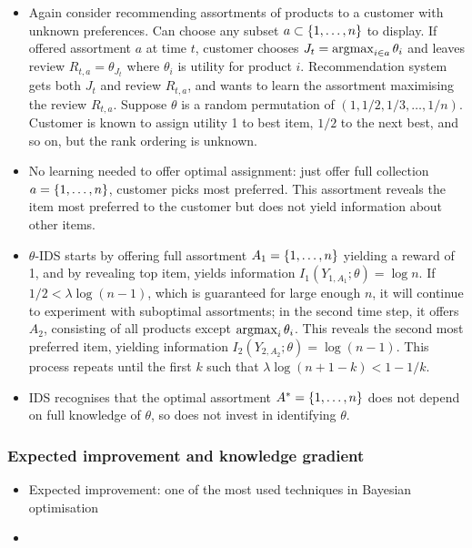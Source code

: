 \documentclass[11pt, openany]{book}
\begin{document}
\begin{example}
    \vspace*{-20pt}
    \begin{itemize}
        \item Again consider recommending assortments of products to a customer with unknown preferences. Can choose any subset $a\subset\left\lbrace1,\dots,n\right\rbrace$ to display. If offered assortment $a$ at time $t$, customer chooses $J_t=\operatorname*{argmax}_{i\in a} \theta_i$ and leaves review $R_{t,a}=\theta_{J_t}$ where $\theta_i$ is utility for product $i$. Recommendation system gets both $J_t$ and review $R_{t,a}$, and wants to learn the assortment maximising the review $R_{t,a}$. Suppose $\theta$ is a random permutation of $(1,1/2,1/3,\dots,1/n)$. Customer is known to assign utility 1 to best item, $1/2$ to the next best, and so on, but the rank ordering is unknown.
        \item No learning needed to offer optimal assignment: just offer full collection $a=\left\lbrace1,\dots,n\right\rbrace$, customer picks most preferred. This assortment reveals the item most preferred to the customer but does not yield information about other items. 
        \item $\theta$-IDS starts by offering full assortment $A_1=\left\lbrace1,\dots,n\right\rbrace$ yielding a reward of 1, and by revealing top item, yields information $I_1(Y_{1,A_1};\theta)=\log n$. If $1/2<\lambda\log(n-1)$, which is guaranteed for large enough $n$, it will continue to experiment with suboptimal assortments; in the second time step, it offers $A_2$, consisting of all products except $\operatorname*{argmax}_i\theta_i$. This reveals the second most preferred item, yielding information $I_2(Y_{2,A_2};\theta)=\log(n-1)$. This process repeats until the first $k$ such that $\lambda\log(n+1-k) < 1-1/k$.
        \item IDS recognises that the optimal assortment $A^*=\left\lbrace1,\dots,n\right\rbrace$ does not depend on full knowledge of $\theta$, so does not invest in identifying $\theta$.
    \end{itemize}
\end{example}

\subsubsection{Expected improvement and knowledge gradient}
\begin{itemize}
    \item Expected improvement: one of the most used techniques in Bayesian optimisation
    \item 
\end{itemize}
\end{document}
